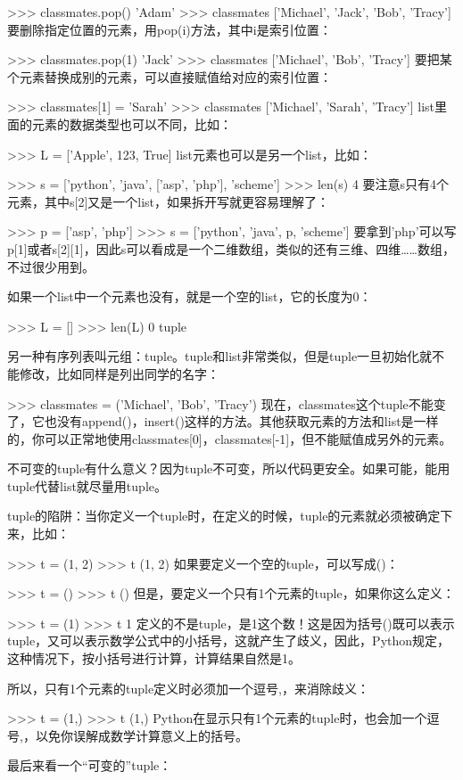 >>> classmates.pop()
'Adam'
>>> classmates
['Michael', 'Jack', 'Bob', 'Tracy']
要删除指定位置的元素，用pop(i)方法，其中i是索引位置：

>>> classmates.pop(1)
'Jack'
>>> classmates
['Michael', 'Bob', 'Tracy']
要把某个元素替换成别的元素，可以直接赋值给对应的索引位置：

>>> classmates[1] = 'Sarah'
>>> classmates
['Michael', 'Sarah', 'Tracy']
list里面的元素的数据类型也可以不同，比如：

>>> L = ['Apple', 123, True]
list元素也可以是另一个list，比如：

>>> s = ['python', 'java', ['asp', 'php'], 'scheme']
>>> len(s)
4
要注意s只有4个元素，其中s[2]又是一个list，如果拆开写就更容易理解了：

>>> p = ['asp', 'php']
>>> s = ['python', 'java', p, 'scheme']
要拿到'php'可以写p[1]或者s[2][1]，因此s可以看成是一个二维数组，类似的还有三维、四维……数组，不过很少用到。

如果一个list中一个元素也没有，就是一个空的list，它的长度为0：

>>> L = []
>>> len(L)
0
tuple

另一种有序列表叫元组：tuple。tuple和list非常类似，但是tuple一旦初始化就不能修改，比如同样是列出同学的名字：

>>> classmates = ('Michael', 'Bob', 'Tracy')
现在，classmates这个tuple不能变了，它也没有append()，insert()这样的方法。其他获取元素的方法和list是一样的，你可以正常地使用classmates[0]，classmates[-1]，但不能赋值成另外的元素。

不可变的tuple有什么意义？因为tuple不可变，所以代码更安全。如果可能，能用tuple代替list就尽量用tuple。

tuple的陷阱：当你定义一个tuple时，在定义的时候，tuple的元素就必须被确定下来，比如：

>>> t = (1, 2)
>>> t
(1, 2)
如果要定义一个空的tuple，可以写成()：

>>> t = ()
>>> t
()
但是，要定义一个只有1个元素的tuple，如果你这么定义：

>>> t = (1)
>>> t
1
定义的不是tuple，是1这个数！这是因为括号()既可以表示tuple，又可以表示数学公式中的小括号，这就产生了歧义，因此，Python规定，这种情况下，按小括号进行计算，计算结果自然是1。

所以，只有1个元素的tuple定义时必须加一个逗号,，来消除歧义：

>>> t = (1,)
>>> t
(1,)
Python在显示只有1个元素的tuple时，也会加一个逗号,，以免你误解成数学计算意义上的括号。

最后来看一个“可变的”tuple：

